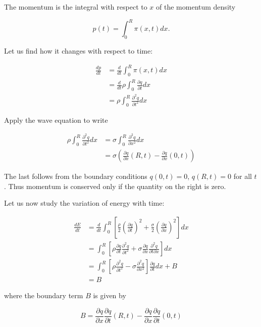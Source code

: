 The momentum is the integral with respect to $x$ of the momentum density

\begin{equation}
p(t) = \int_0^R \pi(x,t) dx .
\end{equation}

Let us find how it changes with respect to time:

\begin{align}
\frac{ dp}{dt} &= \frac{d}{dt} \int_0^R \pi(x,t) dx \\
&= \frac{d}{dt} \rho \int_0^R \frac{\partial q}{\partial t} dx \\
&=  \rho \int_0^R \frac{\partial^2 q}{\partial t^2} dx 
\end{align}

Apply the wave equation to write

\begin{align}
\rho \int_0^R \frac{\partial^2 q}{\partial t^2} dx  
&= \sigma \int_0^R \frac{\partial^2 q}{\partial x^2} dx  \\
&= \sigma \left(  \frac{\partial q}{\partial x}( R, t ) - \frac{\partial q}{\partial x}(0, t) \right)
\end{align}

The last follows from the boundary conditions $q(0, t) = 0$, 
$q(R, t) = 0$ for all $t$.  Thus momentum is conserved only if the quantity on the right is zero.  


Let us now study the variation of energy with time:

\begin{align}
\frac{dE}{dt} &= \frac{d}{dt} \int_0^R \left[
\frac{\rho}{2}\left(\frac{\partial q}{\partial t} \right)^2 
+
\frac{\sigma}{2} \left(\frac{\partial q}{\partial x} \right)^2
\right] dx \\
&= \int_0^R \left[
\rho\frac{\partial q}{\partial t} \frac{\partial^2 q}{\partial t^2} 
+
\sigma \frac{\partial q}{\partial x} \frac{\partial^2 q}{\partial t\partial x} 
\right] dx \\
&= \int_0^R \left[
\rho\frac{\partial^2 q}{\partial t^2} 
-
\sigma \frac{\partial^2 q}{\partial x^2} 
\right] \frac{\partial q}{\partial t} dx  + B\\
&= B
\end{align}

where the boundary term $B$ is given by

\begin{equation}
B = \frac{\partial q}{\partial x}\frac{\partial q}{\partial t}(R,t) 
- \frac{\partial q}{\partial x}\frac{\partial q}{\partial t}(0,t)
\end{equation}

